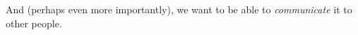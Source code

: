 \documentclass[10pt]{article}
\theoremstyle{definition}
\begin{document}
{%
And (perhaps even more importantly), we want to be able to
\emph{communicate} it to other people.

}
\end{document}
